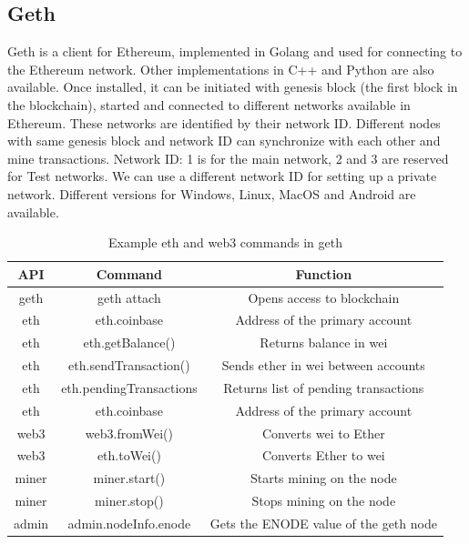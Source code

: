 \documentclass[11pt,openright]{report}
\begin{document}
\subsection{Geth}
Geth is a client for Ethereum, implemented in Golang and used for connecting to the Ethereum network. Other implementations in C++ and Python are also available. Once installed, it can be initiated with genesis block (the first block in the blockchain), started and connected to different networks available in Ethereum. These networks are identified by their network ID. Different nodes with same genesis block and network ID can synchronize with each other and mine transactions. Network ID: 1 is for the main network, 2 and 3 are reserved for Test networks. We can use a different network ID for setting up a private network. Different versions for Windows, Linux, MacOS and Android are available.
\newpage
\hfill\\
\begin{table}[!htbp]
	\renewcommand{\arraystretch}{1.3}
	\caption{Example eth and web3 commands in geth}
	\label{geth_commands}
	\centering
	\begin{tabular}{|c|c|c|}
		\hline
		\bfseries API & \bfseries Command & \bfseries Function \\
		\hline\hline
		geth & geth attach & Opens access to blockchain \\ \hline
		eth & eth.coinbase & Address of the primary account \\ \hline
		eth & eth.getBalance() & Returns balance in wei \\ \hline
        eth & eth.sendTransaction() & Sends ether in wei between accounts \\ \hline
        eth & eth.pendingTransactions & Returns list of pending transactions\\ \hline
        eth & eth.coinbase & Address of the primary account \\ \hline
        web3 & web3.fromWei() & Converts wei to Ether \\ \hline
        web3 & eth.toWei() & Converts Ether to wei \\ \hline
        miner & miner.start() & Starts mining on the node \\ \hline
        miner & miner.stop() & Stops mining on the node \\ \hline
        admin & admin.nodeInfo.enode & Gets the ENODE value of the geth node \\ \hline
	\end{tabular}
\end{table}
\newline
\newline
\end{document}
